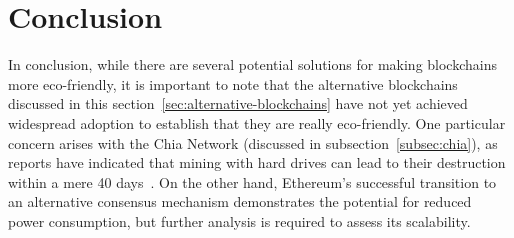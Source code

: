 
\section{Conclusion}\label{sec:conclusion}
In conclusion, while there are several potential solutions for making blockchains more eco-friendly, it is important to note that the alternative blockchains discussed in this section\ \ref{sec:alternative-blockchains} have not yet achieved widespread adoption to establish that they are really eco-friendly.
One particular concern arises with the Chia Network (discussed in subsection\ \ref{subsec:chia}), as reports have indicated that mining with hard drives can lead to their destruction within a mere 40 days~\cite{euronews-chia}.
On the other hand, Ethereum's successful transition to an alternative consensus mechanism demonstrates the potential for reduced power consumption, but further analysis is required to assess its scalability.
